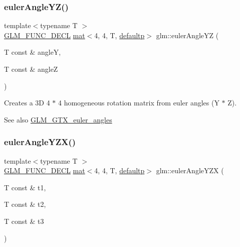\subsubsection{\texorpdfstring{euler\+Angle\+Y\+Z()}{eulerAngleYZ()}}
{\footnotesize\ttfamily template$<$typename T $>$ \\
\mbox{\hyperlink{setup_8hpp_ab2d052de21a70539923e9bcbf6e83a51}{G\+L\+M\+\_\+\+F\+U\+N\+C\+\_\+\+D\+E\+CL}} \mbox{\hyperlink{structglm_1_1mat}{mat}}$<$4, 4, T, \mbox{\hyperlink{namespaceglm_a36ed105b07c7746804d7fdc7cc90ff25a9d21ccd8b5a009ec7eb7677befc3bf51}{defaultp}}$>$ glm\+::euler\+Angle\+YZ (\begin{DoxyParamCaption}\item[{T const \&}]{angleY,  }\item[{T const \&}]{angleZ }\end{DoxyParamCaption})}

Creates a 3D 4 $\ast$ 4 homogeneous rotation matrix from euler angles (Y $\ast$ Z). \begin{DoxySeeAlso}{See also}
\mbox{\hyperlink{group__gtx__euler__angles}{G\+L\+M\+\_\+\+G\+T\+X\+\_\+euler\+\_\+angles}} 
\end{DoxySeeAlso}
\mbox{\label{group__gtx__euler__angles_ga08bef16357b8f9b3051b3dcaec4b7848}} 
\subsubsection{\texorpdfstring{euler\+Angle\+Y\+Z\+X()}{eulerAngleYZX()}}
{\footnotesize\ttfamily template$<$typename T $>$ \\
\mbox{\hyperlink{setup_8hpp_ab2d052de21a70539923e9bcbf6e83a51}{G\+L\+M\+\_\+\+F\+U\+N\+C\+\_\+\+D\+E\+CL}} \mbox{\hyperlink{structglm_1_1mat}{mat}}$<$4, 4, T, \mbox{\hyperlink{namespaceglm_a36ed105b07c7746804d7fdc7cc90ff25a9d21ccd8b5a009ec7eb7677befc3bf51}{defaultp}}$>$ glm\+::euler\+Angle\+Y\+ZX (\begin{DoxyParamCaption}\item[{T const \&}]{t1,  }\item[{T const \&}]{t2,  }\item[{T const \&}]{t3 }\end{DoxyParamCaption})}

